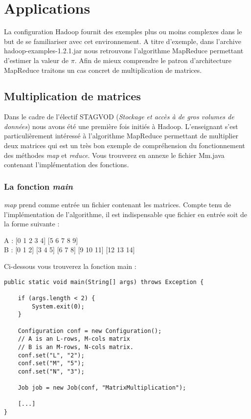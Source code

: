 \section{Applications}

\par La configuration Hadoop fournit des exemples plus ou moins complexes dans le but de se familiariser avec cet environnement. A titre d'exemple, dans l'archive hadoop-examples-1.2.1.jar nous retrouvons l'algorithme MapReduce permettant d'estimer la valeur de $\pi$. Afin de mieux comprendre le patron d'architecture MapReduce traitons un cas concret de multiplication de matrices.

\subsection{Multiplication de matrices}

\par Dans le cadre de l'électif STAGVOD (\textit{Stockage et accès à de gros volumes de données}) nous avons été une première fois initiés à Hadoop. L'enseignant s'est particulièrement intéressé à l'algorithme MapReduce permettant de multiplier deux matrices qui est un très bon exemple de compréhension du fonctionnement des méthodes \textit{map} et \textit{reduce}. Vous trouverez en annexe le fichier Mm.java contenant l'implémentation des fonctions.

\subsubsection{La fonction \textit{main}}

\par \textit{map} prend comme entrée un fichier contenant les matrices. Compte tenu de l'implémentation de l'algorithme, il est indispensable que fichier en entrée soit de la forme suivante :

\indent A : [0 1 2 3 4] [5 6 7 8 9]\\
\indent B : [0 1 2] [3 4 5] [6 7 8] [9 10 11] [12 13 14]

\par Ci-dessous vous trouverez la fonction main :

\begin{verbatim}
public static void main(String[] args) throws Exception {

	if (args.length < 2) {
		System.exit(0);
	}
	
	Configuration conf = new Configuration();
	// A is an L-rows, M-cols matrix
	// B is an M-rows, N-cols matrix.
	conf.set("L", "2");   
	conf.set("M", "5");
	conf.set("N", "3");

	Job job = new Job(conf, "MatrixMultiplication");
	
	[...]
}
\end{verbatim}

